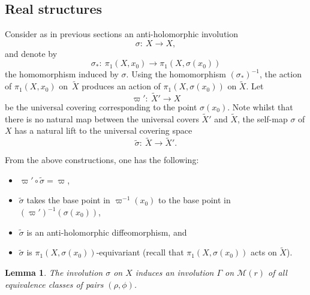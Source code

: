 \documentclass[10pt,a4paper]{amsart}
\numberwithin{equation}{section}
\newtheorem{Lemma}[Theorem]{Lemma}
\begin{document}
\subsection{Real structures} Consider as in previous sections an anti-holomorphic involution
\[
\sigma\colon\ X \longrightarrow X,
\]
and denote by
\begin{equation}\label{o0}
\sigma_*\colon\ \pi_1(X, x_0) \longrightarrow \pi_1(X, \sigma(x_0))
\end{equation}
 the homomorphism induced by $\sigma$. Using the homomorphism $(\sigma_*)^{-1}$, the
action of $\pi_1(X, x_0)$ on~$\widetilde{X}$ produces an action of
$\pi_1(X, \sigma(x_0))$ on $\widetilde{X}$. Let
\[
\varpi'\colon\ \widetilde{X}' \longrightarrow X
\]
be the universal covering corresponding to the point $\sigma(x_0)$. Note whilst that there
is no natural map between the universal covers $\widetilde{X}'$ and $\widetilde{X}$,
the self-map $\sigma$ of $X$ has a natural lift to the universal covering space
\begin{equation}\label{o-1}
\widetilde{\sigma}\colon\ \widetilde{X} \longrightarrow \widetilde{X}'.
\end{equation}
\begin{Remark}From the above constructions, one has the following:
\begin{itemize}\itemsep=0pt
\item[(1)] $\varpi'\circ \widetilde{\sigma} = \varpi$,

\item[(2)] $\widetilde{\sigma}$ takes the base point in $\varpi^{-1}(x_0)$ to the base point
in $(\varpi')^{-1}(\sigma(x_0))$,

\item[(3)] $\widetilde{\sigma}$ is an anti-holomorphic diffeomorphism, and

\item[(4)] $\widetilde{\sigma}$ is $\pi_1(X, \sigma(x_0))$-equivariant \big(recall that
$\pi_1(X, \sigma(x_0))$ acts on $\widetilde{X}$\big).
\end{itemize}
\end{Remark}
\begin{Lemma}\label{newinvo} The involution $\sigma$ on $X$ induces an involution $\Gamma$ on ${\mathcal M}(r)$ of all equivalence
classes of pairs $(\rho, \phi)$.
\end{Lemma}
\end{document}
